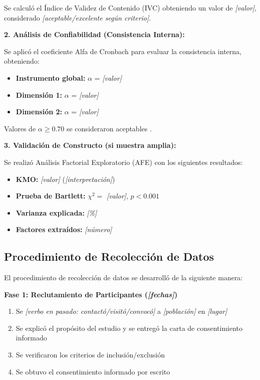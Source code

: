 Se calculó el Índice de Validez de Contenido (IVC) obteniendo un valor de \textit{[valor]}, considerado \textit{[aceptable/excelente según criterio]}.

\textbf{2. Análisis de Confiabilidad (Consistencia Interna):}

Se aplicó el coeficiente Alfa de Cronbach para evaluar la consistencia interna, obteniendo:

\begin{itemize}
    \item \textbf{Instrumento global:} $\alpha$ = \textit{[valor]}
    \item \textbf{Dimensión 1:} $\alpha$ = \textit{[valor]}
    \item \textbf{Dimensión 2:} $\alpha$ = \textit{[valor]}
\end{itemize}

Valores de $\alpha \geq 0.70$ se consideraron aceptables \cite{referencia_metodologica}.

\textbf{3. Validación de Constructo (si muestra amplia):}

Se realizó Análisis Factorial Exploratorio (AFE) con los siguientes resultados:

\begin{itemize}
    \item \textbf{KMO:} \textit{[valor]} (\textit{[interpretación]})
    \item \textbf{Prueba de Bartlett:} $\chi^2 = $ \textit{[valor]}, $p < 0.001$
    \item \textbf{Varianza explicada:} \textit{[\%]}
    \item \textbf{Factores extraídos:} \textit{[número]}
\end{itemize}

\subsection{Procedimiento de Recolección de Datos}
\label{subsec:procedimiento_recoleccion}


El procedimiento de recolección de datos se desarrolló de la siguiente manera:

\textbf{Fase 1: Reclutamiento de Participantes (\textit{[fechas]})}

\begin{enumerate}
    \item Se \textit{[verbo en pasado: contactó/visitó/convocó]} a \textit{[población]} en \textit{[lugar]}
    \item Se explicó el propósito del estudio y se entregó la carta de consentimiento informado
    \item Se verificaron los criterios de inclusión/exclusión
    \item Se obtuvo el consentimiento informado por escrito
\end{enumerate}


